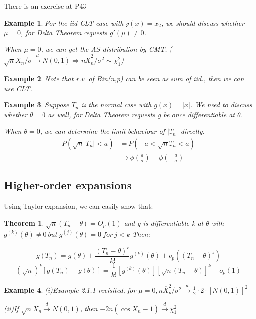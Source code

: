 \documentclass{ctexart}
\newtheorem{theorem}{Theorem}[subsection]
\newtheorem{example}{Example}[subsection]
\begin{document}
There is an exercise at P43-

\begin{example}
  For the iid CLT case with \(g(x)=x_{2}\), we should discuss whether \(\mu=0\), for Delta Theorem requests \(g'(\mu)\neq 0\).
  
  When \(\mu=0\), we can get the AS distribution by CMT. (\(\sqrt{n}\overline{X}_n/\sigma \xrightarrow{d}N(0,1) \Rightarrow n \overline{X}_n^2 /\sigma^2 \sim \chi^2_1\))  
\end{example}
\begin{example}
  Note that r.v. of Bin(n,p) can be seen as sum of iid., then we can use CLT.
\end{example}
\begin{example}
  Suppose \(T_{n}\) is the normal case with \(g(x)=|x|\). We need to discuss whether \(\theta=0\) as well, for Delta Theorem requests g be once differentiable at \(\theta\).

  When \(\theta=0\), we can determine the limit behaviour of \(|T_{n}|\) directly. 
  \[
  \begin{align}
  P(\sqrt{n}|T_{n}|<a)&=P(-a<\sqrt{n}T_{n}<a)\\&\to \phi(\frac{a}{\sigma})-\phi(-\frac{a}{\sigma})
  \end{align}
  \] 
\end{example}
\subsection{Higher-order expansions}
Using Taylor expansion, we can easily show that: 
\begin{theorem}
  \(\sqrt{n}(T_{n}-\theta)=O_{p}(1)\) and g is differentiable k at \(\theta\) with \(g^{(k)}(\theta)\neq 0\ but\ g^{(j)}(\theta)=0\ for\ j<k\)
  Then: 

  \[
  g(T_{n})=g(\theta)+\frac{(T_{n}-\theta)^{k}}{k!}g^{(k)}(\theta)+o_p((T_n-\theta)^{k})
  \] 
  \[
  (\sqrt{n})^{k}[g(T_{n})-g(\theta)]=\frac{1}{k!}[g^{(k)}(\theta)][\sqrt{n}(T_{n}-\theta)]^{k}+o_p(1)
  \] 
\end{theorem}
\begin{example}
  (i)Example 2.1.1 revisited, for \(\mu=0, n \overline{X}_{n}^{2}/\sigma^{2}\xrightarrow{d}\frac{1}{2}\cdot 2\cdot [N(0,1)]^{2}\)
  
  (ii)If \(\sqrt{n}\overline{X}_{n}\xrightarrow{d}N(0,1)\), then \(-2n(\cos \overline{X}_n -1)\xrightarrow{d}\chi_{1}^{2}\)  
\end{example}
\end{document}
